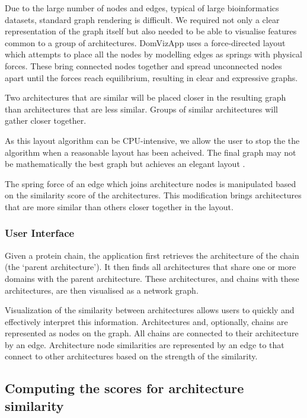 Due to the large number of nodes and edges, typical of large bioinformatics datasets, standard graph rendering is difficult. We required not only a clear representation of the graph itself but also needed to be able to visualise features common to a group of architectures. DomVizApp uses a force-directed layout \cite{force} which attempts to place all the nodes by modelling edges as springs with physical forces. These bring connected nodes together and spread unconnected nodes apart until the forces reach equilibrium, resulting in clear and expressive graphs. 

Two architectures that are similar will be placed closer in the resulting graph than architectures that are less similar. Groups of similar architectures will gather closer together.

As this layout algorithm can be CPU-intensive, we allow the user to stop the the algorithm when a reasonable layout has been acheived. The final graph may not be mathematically the best graph but achieves an elegant layout \cite{force}.

The spring force of an edge which joins architecture nodes is manipulated based on the similarity score of the architectures. This modification brings architectures that are more similar than others closer together in the layout. 



\subsubsection{User Interface}
Given a protein chain, the application first retrieves the architecture of the chain (the `parent architecture'). It then finds all architectures that share one or more domains with the parent architecture.  These architectures, and chains with these architectures, are then visualised as a network graph.

Visualization of the similarity between architectures allows users to quickly and effectively interpret this information. Architectures and, optionally, chains are represented as nodes on the graph. All chains are connected to their architecture by an edge. Architecture node similarities are represented by an edge to that connect to other architectures based on the strength of the similarity. 


\subsection{Computing the scores for architecture similarity}

